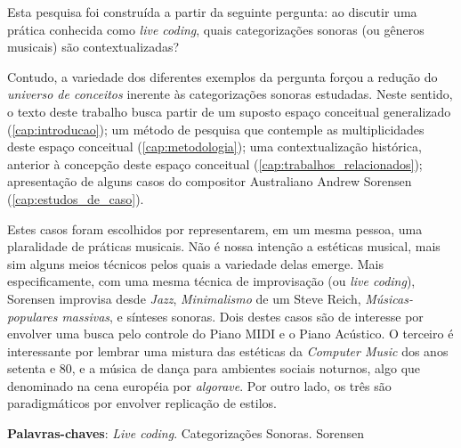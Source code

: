 \setlength{\absparsep}{18pt} %
\begin{resumo}
Esta pesquisa foi construída a partir da seguinte pergunta: ao discutir uma prática conhecida como \textit{live coding}, quais categorizações sonoras (ou gêneros musicais) são contextualizadas? 

Contudo, a variedade dos diferentes exemplos da pergunta forçou a redução do \emph{universo de conceitos} inerente às categorizações sonoras estudadas. Neste sentido, o texto deste trabalho busca partir de um suposto espaço conceitual generalizado (\autoref{cap:introducao}); um método de pesquisa que contemple as multiplicidades deste espaço conceitual (\autoref{cap:metodologia}); uma contextualização histórica, anterior à concepção deste espaço conceitual (\autoref{cap:trabalhos_relacionados}); apresentação de alguns casos do compositor Australiano Andrew Sorensen (\autoref{cap:estudos_de_caso}).

Estes casos foram escolhidos por representarem, em um mesma pessoa, uma plaralidade de práticas musicais. Não é nossa intenção a estéticas musical, mais sim alguns meios técnicos pelos quais a variedade delas emerge. Mais especificamente, com uma mesma técnica de improvisação (ou \emph{live coding}), Sorensen improvisa desde \emph{Jazz}, \emph{Minimalismo} de um Steve Reich, \emph{Músicas-populares massivas}, e sínteses sonoras. Dois destes casos são de interesse por envolver uma busca pelo controle do Piano MIDI e o Piano Acústico. O terceiro é interessante por lembrar uma mistura das estéticas da \emph{Computer Music} dos anos setenta e 80, e a música de dança para ambientes sociais noturnos, algo que denominado na cena européia por \emph{algorave}. Por outro lado, os três são paradigmáticos por envolver replicação de estilos.

\textbf{Palavras-chaves}: \textit{Live coding}. Categorizações Sonoras. Sorensen
\end{resumo}

